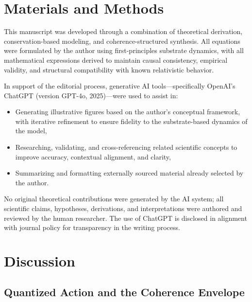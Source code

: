 \documentclass[entropy,article,submit,pdftex,moreauthors]{Definitions/mdpi}
\begin{document}
\section{Materials and Methods}
This manuscript was developed through a combination of theoretical derivation, conservation-based modeling, and coherence-structured synthesis. All equations were formulated by the author using first-principles substrate dynamics, with all mathematical expressions derived to maintain causal consistency, empirical validity, and structural compatibility with known relativistic behavior.

In support of the editorial process, generative AI tools—specifically OpenAI's ChatGPT (version GPT-4o, 2025)—were used to assist in:
\begin{itemize}
    \item Generating illustrative figures based on the author’s conceptual framework, with iterative refinement to ensure fidelity to the substrate-based dynamics of the model,
    \item Researching, validating, and cross-referencing related scientific concepts to improve accuracy, contextual alignment, and clarity,
    \item Summarizing and formatting externally sourced material already selected by the author.
\end{itemize}

No original theoretical contributions were generated by the AI system; all scientific claims, hypotheses, derivations, and interpretations were authored and reviewed by the human researcher. The use of ChatGPT is disclosed in alignment with journal policy for transparency in the writing process.


\section{Discussion}
\subsection{Quantized Action and the Coherence Envelope}
\end{document}
